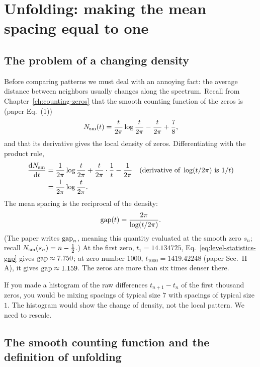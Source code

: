 \section{Unfolding: making the mean spacing equal to one}\label{sec:level-statistics-unfolding}

\subsection{The problem of a changing density}

Before comparing patterns we must deal with an annoying fact: the average distance between neighbors usually changes along the spectrum. Recall from Chapter~\ref{ch:counting-zeros} that the smooth counting function of the zeros is (paper Eq.~(1))
\begin{equation}
N_{\mathrm{sm}}(t)=\frac{t}{2\pi}\log\frac{t}{2\pi}-\frac{t}{2\pi}+\frac78,
\label{eq:level-statistics-nsm}
\end{equation}
and that its derivative gives the local density of zeros. Differentiating with the product rule,
\begin{align}
\frac{\mathrm{d} N_{\mathrm{sm}}}{\mathrm{d} t}
&=\frac{1}{2\pi}\log\frac{t}{2\pi}+\frac{t}{2\pi}\cdot\frac{1}{t}-\frac{1}{2\pi}
\quad\text{(derivative of }\log(t/2\pi)\text{ is }1/t)\nonumber\\
&=\frac{1}{2\pi}\log\frac{t}{2\pi}.
\label{eq:level-statistics-density}
\end{align}
The mean spacing is the reciprocal of the density:
\begin{equation}
\mathrm{gap}(t)=\frac{2\pi}{\log(t/2\pi)}.
\label{eq:level-statistics-gap}
\end{equation}
(The paper writes $\mathrm{gap}_n$, meaning this quantity evaluated at the smooth zero $s_n$; recall $N_{\mathrm{sm}}(s_n)=n-\tfrac12$.) At the first zero, $t_1=14.134725$, Eq.~\eqref{eq:level-statistics-gap} gives $\mathrm{gap}\approx7.750$; at zero number 1000, $t_{1000}=1419.42248$ (paper Sec.~II A), it gives $\mathrm{gap}\approx1.159$. The zeros are more than six times denser there.

If you made a histogram of the raw differences $t_{n+1}-t_n$ of the first thousand zeros, you would be mixing spacings of typical size $7$ with spacings of typical size $1$. The histogram would show the change of density, not the local pattern. We need to rescale.

\subsection{The smooth counting function and the definition of unfolding}

